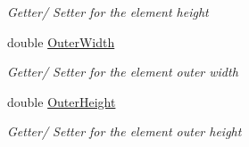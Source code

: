 \begin{DoxyCompactItemize}
\begin{DoxyCompactList}\small\item\em Getter/ Setter for the element height \end{DoxyCompactList}\item 
double \hyperlink{class_web_analyzer_1_1_models_1_1_data_model_1_1_d_o_m_element_model_a3bf025c2cfc55086914d5f262b2f3e3e}{Outer\+Width}
\begin{DoxyCompactList}\small\item\em Getter/ Setter for the element outer width \end{DoxyCompactList}\item 
double \hyperlink{class_web_analyzer_1_1_models_1_1_data_model_1_1_d_o_m_element_model_a9c280fbbc109f824b51ca934192da464}{Outer\+Height}
\begin{DoxyCompactList}\small\item\em Getter/ Setter for the element outer height \end{DoxyCompactList}\end{DoxyCompactItemize}
